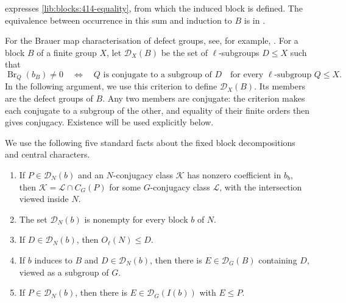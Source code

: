 \begin{implementation}
 expresses
\eqref{lib:blocks:414-equality}, from which the induced block is defined.
The equivalence between occurrence in this sum and induction to $B$ is
in .
\end{implementation}

For the Brauer map characterisation of defect groups, see, for example,
\cite[Theorem~4.11]{Navarro1998}. For a block $B$ of a finite group
$X$, let $\mathcal D_X(B)$ be the set of $\ell$-subgroups $D\leq X$
such that
\begin{equation}
 \operatorname{Br}_Q(b_B)\ne0
 \quad\Longleftrightarrow\quad
 Q\text{ is conjugate to a subgroup of }D
 \quad\text{for every }\ell\text{-subgroup }Q\leq X.
 \label{lib:blocks:defect-support}
\end{equation}
In the following argument, we use this criterion to define
$\mathcal D_X(B)$. Its members are the defect groups of $B$.
Any two members are conjugate: the criterion makes each conjugate to
a subgroup of the other, and equality of their finite orders then gives
conjugacy. Existence will be used explicitly below.

\begin{hypothesis}
\label{lib:blocks:defect-hypotheses}
We use the following five standard facts about the fixed block
decompositions and central characters.
\begin{enumerate}
\item If $P\in\mathcal D_N(b)$ and an $N$-conjugacy class
$\mathcal K$ has nonzero coefficient in $b_b$, then
$\mathcal K=\mathcal L\cap C_G(P)$ for some $G$-conjugacy class
$\mathcal L$, with the intersection viewed inside $N$.
\item The set $\mathcal D_N(b)$ is nonempty for every block $b$ of $N$.
\item If $D\in\mathcal D_N(b)$, then $O_\ell(N)\leq D$.
\item If $b$ induces to $B$ and $D\in\mathcal D_N(b)$, then there is
$E\in\mathcal D_G(B)$ containing $D$, viewed as a subgroup of $G$.
\item If $P\in\mathcal D_N(b)$, then there is
$E\in\mathcal D_G(I(b))$ with $E\leq P$.
\end{enumerate}
\end{hypothesis}

